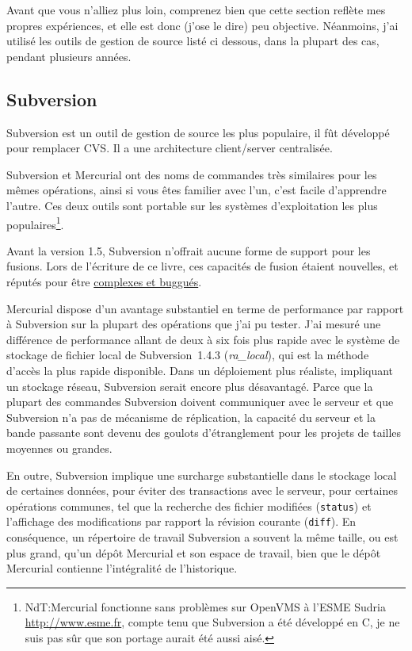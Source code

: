 Avant que vous n'alliez plus loin, comprenez bien que cette section
reflète mes propres expériences, et elle est donc (j'ose le dire)
peu objective. Néanmoins, j'ai utilisé les outils de gestion de source
listé ci dessous, dans la plupart des cas, pendant plusieurs années.

\subsection{Subversion}

Subversion est un outil de gestion de source les plus populaire, il fût 
développé pour remplacer CVS. Il a une architecture client/server centralisée.

Subversion et Mercurial ont des noms de commandes très similaires pour 
les mêmes opérations, ainsi si vous êtes familier avec l'un, c'est facile
d'apprendre l'autre. Ces deux outils sont portable sur les systèmes 
d'exploitation les plus populaires\footnote{NdT:Mercurial fonctionne sans problèmes
sur OpenVMS à l'ESME Sudria \url{http://www.esme.fr}, compte tenu que Subversion a été 
développé en C, je ne suis pas sûr que son portage aurait été aussi aisé.}.

Avant la version 1.5, Subversion n'offrait aucune forme de support pour les fusions. Lors 
de l'écriture de ce livre, ces capacités de fusion étaient nouvelles, et réputés pour être
\href{http://svnbook.red-bean.com/nightly/en/svn.branchmerge.advanced.html#svn.branchmerge.advanced.finalword}{complexes
et buggués}.

Mercurial dispose d'un avantage substantiel en terme de performance par rapport à 
Subversion sur la plupart des opérations que j'ai pu tester. J'ai mesuré
une différence de performance allant de deux à six fois plus rapide avec
le système de stockage de fichier local de Subversion~1.4.3 
(\emph{ra\_local}), qui est la méthode d'accès la plus rapide disponible. Dans
un déploiement plus réaliste, impliquant un stockage réseau, Subversion 
serait encore plus désavantagé. Parce que la plupart des commandes Subversion
doivent communiquer avec le serveur et que Subversion n'a pas de mécanisme
de réplication, la capacité du serveur et la bande passante sont devenu des
goulots d'étranglement pour les projets de tailles moyennes ou grandes.

En outre, Subversion implique une surcharge substantielle dans le stockage local
de certaines données, pour éviter des transactions avec le serveur, pour 
certaines opérations communes, tel que la recherche des fichier modifiées
(\texttt{status}) et l'affichage des modifications par rapport la révision 
courante (\texttt{diff}). En conséquence, un répertoire de travail Subversion
a souvent la même taille, ou est plus grand, qu'un dépôt Mercurial et son
espace de travail, bien que le dépôt Mercurial contienne l'intégralité de
l'historique.

